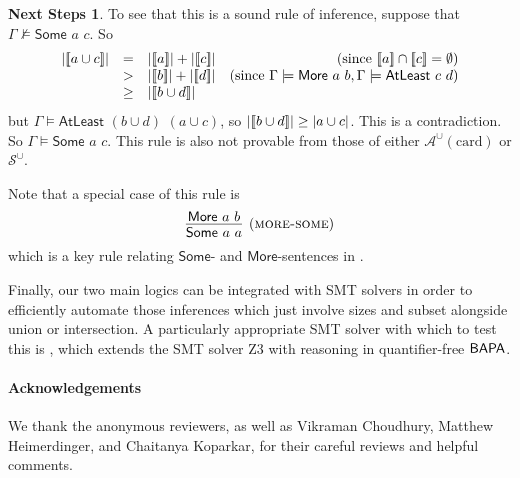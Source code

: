\documentclass[letterpaper]{article}
\theoremstyle{definition}
\newtheorem*{nextsteps*}{Next Steps}
\newcommand{\semantics}[1]{[\![\mbox{\em $ #1 $\/}]\!]}
\newcommand{\Aunion}{\mathscr{A}^{\cup}}
\newcommand{\Sunion}{\mathscr{S}^{\cup}}
\newcommand{\BAPA}{\sf{BAPA}}
\newcommand{\proverule}{\textsc}
\newcommand{\Some}[2]{\mathsf{Some}\,\,#1\,\,#2}
\newcommand{\Atleast}[2]{\mathsf{AtLeast}\,\,#1\,\,#2}
\newcommand{\More}[2]{\mathsf{More}\,\,#1\,\,#2}
\newcommand{\SomeNoArgs}{\mathsf{Some}}
\newcommand{\MoreNoArgs}{\mathsf{More}}
\newcommand{\card}{\mathrm{card}}
\begin{document}
\begin{nextsteps*}
To see that this is a sound rule of inference, suppose that $\Gamma \not \models \Some{a}{c}$.  So
\[
\begin{array}{lclr}
|\semantics{a \cup c}| & = & |\semantics{a}| + |\semantics{c}| & (\textrm{since } \semantics{a} \cap \semantics{c} = \emptyset) \\

& > & |\semantics{b}| + |\semantics{d}| &
(\textrm{since } \Gamma \models \More{a}{b}, \Gamma \models \Atleast{c}{d}) \\

& \ge & |\semantics{b \cup d}| & 
\end{array}
\]
but $\Gamma \models \Atleast{(b \cup d)}{(a \cup c)}$, so $|\semantics{b \cup d}| \ge |a \cup c|$.  This is a contradiction.  So $\Gamma \models \Some{a}{c}$.  This rule is also not provable from those of either $\Aunion(\card)$ or $\Sunion$.

Note that a special case of this rule is
\[
\infer[(\proverule{more-some})]
    {\Some{a}{a}}
    {\More{a}{b}}
\]
which is a key rule relating $\SomeNoArgs$- and $\MoreNoArgs$-sentences in \cite{syllogistic_cardinality_comparisons}.

Finally, our two main logics can be integrated with SMT solvers in order to efficiently automate those inferences which just involve sizes and subset alongside union or intersection.  A particularly appropriate SMT solver with which to test this is \cite{cardinality_constraints_smt}, which extends the SMT solver Z$3$ with reasoning in quantifier-free $\BAPA$.
\end{nextsteps*}

\paragraph{Acknowledgements} We thank the anonymous reviewers, as well as Vikraman Choudhury, Matthew Heimerdinger, and Chaitanya Koparkar, for their careful reviews and helpful comments.





\end{document}
